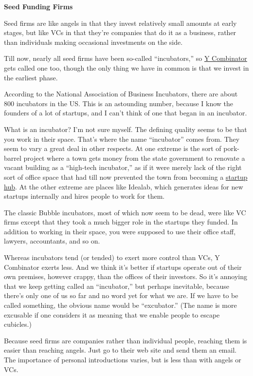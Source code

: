 \textbf{Seed Funding Firms}

Seed firms are like angels in that they invest relatively small amounts
at early stages, but like VCs in that they're companies that do it as a
business, rather than individuals making occasional investments on the
side.

Till now, nearly all seed firms have been so-called ``incubators,'' so
\href{http://ycombinator.com}{Y Combinator} gets called one too, though
the only thing we have in common is that we invest in the earliest
phase.

According to the National Association of Business Incubators, there are
about 800 incubators in the US. This is an astounding number, because I
know the founders of a lot of startups, and I can't think of one that
began in an incubator.

What is an incubator? I'm not sure myself. The defining quality seems to
be that you work in their space. That's where the name ``incubator''
comes from. They seem to vary a great deal in other respects. At one
extreme is the sort of pork-barrel project where a town gets money from
the state government to renovate a vacant building as a ``high-tech
incubator,'' as if it were merely lack of the right sort of office space
that had till now prevented the town from becoming a
\href{siliconvalley.html}{startup hub}. At the other extreme are places
like Idealab, which generates ideas for new startups internally and
hires people to work for them.

The classic Bubble incubators, most of which now seem to be dead, were
like VC firms except that they took a much bigger role in the startups
they funded. In addition to working in their space, you were supposed to
use their office staff, lawyers, accountants, and so on.

Whereas incubators tend (or tended) to exert more control than VCs, Y
Combinator exerts less. And we think it's better if startups operate out
of their own premises, however crappy, than the offices of their
investors. So it's annoying that we keep getting called an
``incubator,'' but perhaps inevitable, because there's only one of us so
far and no word yet for what we are. If we have to be called something,
the obvious name would be ``excubator.'' (The name is more excusable if
one considers it as meaning that we enable people to escape cubicles.)

Because seed firms are companies rather than individual people, reaching
them is easier than reaching angels. Just go to their web site and send
them an email. The importance of personal introductions varies, but is
less than with angels or VCs.

